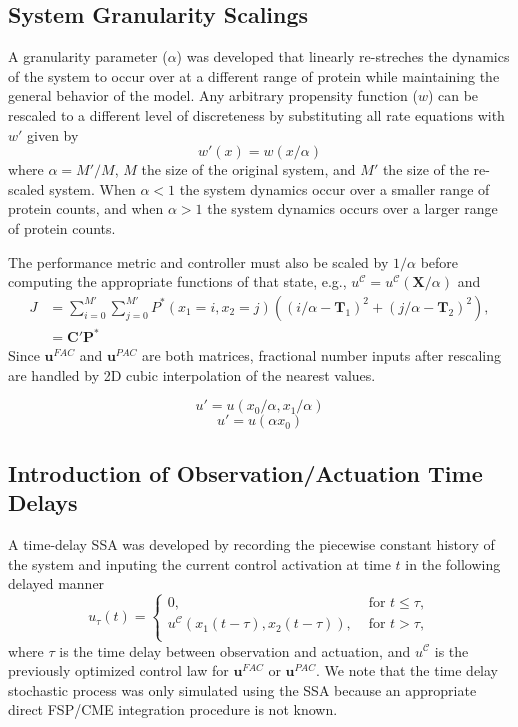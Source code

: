 \documentclass[12pt]{article}
\begin{document}
\subsection{System Granularity Scalings}
A granularity parameter ($\alpha$) was developed that linearly re-streches the dynamics of the system to occur over at a different range of protein while maintaining the general behavior of the model.  Any arbitrary propensity function ($w$) can be rescaled to a different level of discreteness by substituting all rate equations with $w'$ given by
\begin{equation}
w'(x)=w(x/\alpha)
\end{equation}
where $\alpha=M'/M$, $M$ the size of the original system, and $M'$ the size of the re-scaled system. When $\alpha <1 $ the system dynamics occur over a smaller range of protein counts, and when $\alpha >1$ the system dynamics occurs over a larger range of protein counts. 

The performance metric and controller must also be scaled by $1/\alpha$ before computing the appropriate functions of that state, e.g., ${u}^{\mathcal{C}} = {u}^{\mathcal{C}}(\mathbf{X}/\alpha)$ and 
{\small \begin{align}
J &= \sum_{i=0}^{M'}  \sum_{j=0}^{M'}P^*(x_1=i,x_2=j) ((i/\alpha - \mathbf T_1)^2 + (j/\alpha -\mathbf T_2)^2),\nonumber \\
& =\mathbf{C}'\mathbf{P}^*
\label{EuclidV}
\end{align}}
Since $\mathbf{u}^{FAC}$ and $\mathbf{u}^{PAC}$ are both matrices, fractional number inputs after rescaling are handled by 2D cubic interpolation of the nearest values.

\begin{equation}
u'=u(x_0 / \alpha, x_1 / \alpha) 
\end{equation}
\begin{equation}
u'=u(\alpha x_0)
\end{equation}

\subsection{Introduction of Observation/Actuation Time Delays}
A time-delay SSA was developed by recording the piecewise constant history of the system and inputing the current control activation at time $t$ in the following delayed manner
\begin{equation}
u_{\tau}(t)=\left\{
\begin{array}{rl}
      0 ,&\text{ for }  t \leq \tau, \\
      {u}^{\mathcal{C}}(x_1(t-\tau), x_2(t-\tau)) , &\text{ for }   t > \tau,\\
\end{array}\right. 
\label{scoreeq}
\end{equation}
where $\tau$ is the time delay between observation and actuation, and ${u}^{\mathcal{C}}$ is the previously optimized control law for $\mathbf{u}^{FAC}$ or $\mathbf{u}^{PAC}$. We note that the time delay stochastic process was only simulated using the SSA because an appropriate direct FSP/CME integration procedure is not known.
\end{document}
